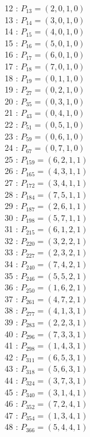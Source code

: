 \documentclass{article}
\begin{document}
{\begin{multicols}{3}
12 : $P_{13}=( 2, 0, 1, 0 )$\\
13 : $P_{14}=( 3, 0, 1, 0 )$\\
14 : $P_{15}=( 4, 0, 1, 0 )$\\
15 : $P_{16}=( 5, 0, 1, 0 )$\\
16 : $P_{17}=( 6, 0, 1, 0 )$\\
17 : $P_{18}=( 7, 0, 1, 0 )$\\
18 : $P_{19}=( 0, 1, 1, 0 )$\\
19 : $P_{27}=( 0, 2, 1, 0 )$\\
20 : $P_{35}=( 0, 3, 1, 0 )$\\
21 : $P_{43}=( 0, 4, 1, 0 )$\\
22 : $P_{51}=( 0, 5, 1, 0 )$\\
23 : $P_{59}=( 0, 6, 1, 0 )$\\
24 : $P_{67}=( 0, 7, 1, 0 )$\\
25 : $P_{159}=( 6, 2, 1, 1 )$\\
26 : $P_{165}=( 4, 3, 1, 1 )$\\
27 : $P_{172}=( 3, 4, 1, 1 )$\\
28 : $P_{184}=( 7, 5, 1, 1 )$\\
29 : $P_{187}=( 2, 6, 1, 1 )$\\
30 : $P_{198}=( 5, 7, 1, 1 )$\\
31 : $P_{215}=( 6, 1, 2, 1 )$\\
32 : $P_{220}=( 3, 2, 2, 1 )$\\
33 : $P_{227}=( 2, 3, 2, 1 )$\\
34 : $P_{240}=( 7, 4, 2, 1 )$\\
35 : $P_{246}=( 5, 5, 2, 1 )$\\
36 : $P_{250}=( 1, 6, 2, 1 )$\\
37 : $P_{261}=( 4, 7, 2, 1 )$\\
38 : $P_{277}=( 4, 1, 3, 1 )$\\
39 : $P_{283}=( 2, 2, 3, 1 )$\\
40 : $P_{296}=( 7, 3, 3, 1 )$\\
41 : $P_{298}=( 1, 4, 3, 1 )$\\
42 : $P_{311}=( 6, 5, 3, 1 )$\\
43 : $P_{318}=( 5, 6, 3, 1 )$\\
44 : $P_{324}=( 3, 7, 3, 1 )$\\
45 : $P_{340}=( 3, 1, 4, 1 )$\\
46 : $P_{352}=( 7, 2, 4, 1 )$\\
47 : $P_{354}=( 1, 3, 4, 1 )$\\
48 : $P_{366}=( 5, 4, 4, 1 )$\\

\end{multicols}}
\end{document}
